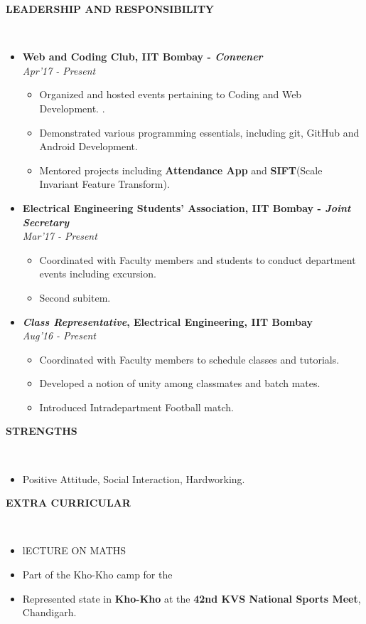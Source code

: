 \documentclass[a4paper,10pt]{article}
\newcommand{\isep}{-2 pt}
\newcommand{\lsep}{-0.5cm}
\newcommand{\resheading}[1]{{\small \colorbox{mygrey}{\begin{minipage}{0.975\textwidth}{\textbf{#1 \vphantom{p\^{E}}}}\end{minipage}}}}
\begin{document}
\resheading{\textbf{LEADERSHIP AND RESPONSIBILITY} }\\[\lsep]
\begin{itemize}
\item \textbf{Web and Coding Club, IIT Bombay - \emph{Convener} 
}  \\
 \emph{Apr'17 - Present} \\[-0.6cm]
	\begin{itemize}\itemsep \isep
	\item Organized and hosted events pertaining to Coding and Web Development.
.
	\item Demonstrated various programming essentials, including git, GitHub and Android Development.

	\item Mentored projects including \textbf{Attendance App} and \textbf{SIFT}(Scale Invariant Feature Transform).

	\end{itemize}

\item \textbf{Electrical Engineering Students' Association, IIT Bombay - \emph{Joint Secretary}
}  \\
 \emph{ Mar'17 - Present} \\[-0.6cm]
	\begin{itemize}\itemsep \isep
	\item Coordinated with Faculty members and students to conduct department events including excursion.
	\item Second subitem.
	\end{itemize}

\item \textbf{\emph{Class Representative}, Electrical Engineering, IIT Bombay
}  \\
 \emph{ Aug'16 - Present} \\[-0.6cm]
	\begin{itemize}\itemsep \isep
	\item Coordinated with Faculty members to schedule classes and tutorials.
	\item Developed a notion of unity among classmates and batch mates.
	\item Introduced Intradepartment Football match.
	\end{itemize}
\end{itemize}

\resheading{\textbf{STRENGTHS} }\\[\lsep]
\begin{itemize}
\item \noindent Positive Attitude, Social Interaction, Hardworking.
\end{itemize}

\resheading{\textbf{EXTRA CURRICULAR} }\\[\lsep]
\begin{itemize}
\item \noindent lECTURE ON MATHS
\item \noindent Part of the Kho-Kho camp for the 
\item \noindent Represented state in \textbf{Kho-Kho} at the \textbf{42nd KVS National Sports Meet}, Chandigarh.


\end{itemize}
\end{document}
